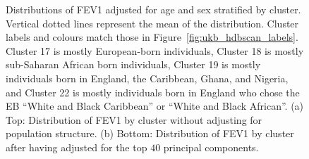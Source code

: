 \begin{figure}[ht]
\begin{subfigure}[b]{0.7\linewidth}
    \caption{}
    \label{fig:supp_pheno_ridge_fev_post}
  \end{subfigure}
  \caption[Distributions of FEV1 by cluster]{Distributions of FEV1 adjusted for age and sex stratified by cluster. Vertical dotted lines represent the mean of the distribution. Cluster labels and colours match those in Figure~\ref{fig:ukb_hdbscan_labels}. Cluster 17 is mostly European-born individuals, Cluster 18 is mostly sub-Saharan African born individuals, Cluster 19 is mostly individuals born in England, the Caribbean, Ghana, and Nigeria, and Cluster 22 is mostly individuals born in England who chose the EB ``White and Black Caribbean'' or ``White and Black African''. (a) Top: Distribution of FEV1 by cluster without adjusting for population structure. (b) Bottom: Distribution of FEV1 by cluster after having adjusted for the top $40$ principal components.}
  \label{fig:supp_pheno_ridge_fev}
\end{figure}

\clearpage

